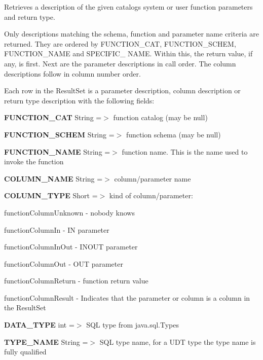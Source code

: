 Retrieves a description of the given catalog\textquotesingle{}s system or user function parameters and return type.

Only descriptions matching the schema, function and parameter name criteria are returned. They are ordered by {\ttfamily F\+U\+N\+C\+T\+I\+O\+N\+\_\+\+C\+AT}, {\ttfamily F\+U\+N\+C\+T\+I\+O\+N\+\_\+\+S\+C\+H\+EM}, {\ttfamily F\+U\+N\+C\+T\+I\+O\+N\+\_\+\+N\+A\+ME} and {\ttfamily S\+P\+E\+C\+I\+F\+I\+C\+\_\+ N\+A\+ME}. Within this, the return value, if any, is first. Next are the parameter descriptions in call order. The column descriptions follow in column number order.

Each row in the {\ttfamily Result\+Set} is a parameter description, column description or return type description with the following fields\+: 
\begin{DoxyEnumerate}
\item {\bfseries F\+U\+N\+C\+T\+I\+O\+N\+\_\+\+C\+AT} String =$>$ function catalog (may be {\ttfamily null}) 
\item {\bfseries F\+U\+N\+C\+T\+I\+O\+N\+\_\+\+S\+C\+H\+EM} String =$>$ function schema (may be {\ttfamily null}) 
\item {\bfseries F\+U\+N\+C\+T\+I\+O\+N\+\_\+\+N\+A\+ME} String =$>$ function name. This is the name used to invoke the function 
\item {\bfseries C\+O\+L\+U\+M\+N\+\_\+\+N\+A\+ME} String =$>$ column/parameter name 
\item {\bfseries C\+O\+L\+U\+M\+N\+\_\+\+T\+Y\+PE} Short =$>$ kind of column/parameter\+: 
\begin{DoxyItemize}
\item function\+Column\+Unknown -\/ nobody knows 
\item function\+Column\+In -\/ IN parameter 
\item function\+Column\+In\+Out -\/ I\+N\+O\+UT parameter 
\item function\+Column\+Out -\/ O\+UT parameter 
\item function\+Column\+Return -\/ function return value 
\item function\+Column\+Result -\/ Indicates that the parameter or column is a column in the {\ttfamily Result\+Set} 
\end{DoxyItemize}
\item {\bfseries D\+A\+T\+A\+\_\+\+T\+Y\+PE} int =$>$ S\+QL type from java.\+sql.\+Types 
\item {\bfseries T\+Y\+P\+E\+\_\+\+N\+A\+ME} String =$>$ S\+QL type name, for a U\+DT type the type name is fully qualified 

\end{DoxyEnumerate}
